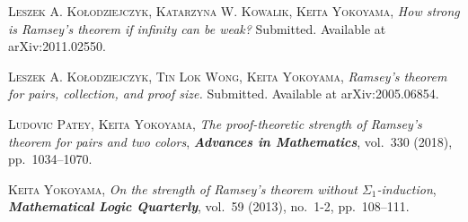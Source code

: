 \documentclass[bsl,meeting]{asl}
\begin{document}
\begin{thebibliography}{10}
 


{\scshape Leszek A. Ko\l{}odziejczyk, Katarzyna W. Kowalik, Keita Yokoyama},
{\itshape How strong is Ramsey's theorem if infinity can be weak?} Submitted. Available at arXiv:2011.02550.


{\scshape Leszek A. Ko\l{}odziejczyk, Tin Lok Wong, Keita Yokoyama},
{\itshape Ramsey’s theorem for pairs, collection, and proof size.} Submitted.
Available at arXiv:2005.06854.

{\scshape Ludovic Patey, Keita Yokoyama},
{\itshape The proof-theoretic strength of Ramsey’s theorem
for pairs and two colors},
{\bfseries\itshape Advances in Mathematics},
vol.~330 (2018), pp.~1034--1070.


{\scshape Keita Yokoyama},
{\itshape On the strength of Ramsey's theorem without {$\Sigma_1$}-induction},
{\bfseries\itshape Mathematical Logic Quarterly},
vol.~59 (2013), no.~1-2, pp.~108--111.



\end{thebibliography}


\vspace*{-0.5\baselineskip}
\end{document}
